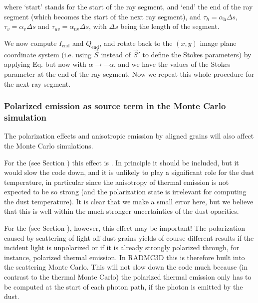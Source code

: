 \documentclass[letterpaper,10pt,english]{sphinxmanual}
\begin{document}
where ‘start’ stands for the start of the ray segment, and ‘end’ the end of the
ray segment (which becomes the start of the next ray segment), and
\(\tau_h=\alpha_{\mathrm{h}}\Delta s\),
\(\tau_v=\alpha_{\mathrm{v}}\Delta s\) and
\(\tau_{uv}=\alpha_{\mathrm{uv}}\Delta s\), with \(\Delta s\) being the
length of the segment.

We now compute \(I_{\mathrm{end}}\) and \(Q_{\mathrm{end}}\), and rotate
back to the \((x,y)\) image plane coordinate system (i.e. using \(\vec
S\) instead of \(\vec S'\) to define the Stokes parameters) by applying
Eq.  but now with \(\alpha\rightarrow -\alpha\),
and we have the values of the Stokes parameter at the end of the ray
segment. Now we repeat this whole procedure for the next ray segment.


\subsubsection{Polarized emission as source term in the Monte Carlo simulation}
\label{\detokenize{dustradtrans:polarized-emission-as-source-term-in-the-monte-carlo-simulation}}
The polarization effects and anisotropic emission by aligned grains will
also affect the Monte Carlo simulations.

For the  (see Section {\hyperref[\detokenize{dustradtrans:sec-dust-thermal-monte-carlo}]{}})
this effect is . In principle it should be included, but it would
slow the code down, and it is unlikely to play a significant role for the dust
temperature, in particular since the anisotropy of thermal emission is not
expected to be so strong (and the polarization state is irrelevant for computing
the dust temperature). It is clear that we make a small error here, but we
believe that this is well within the much stronger uncertainties of the dust
opacities.

For the  (see Section {\hyperref[\detokenize{dustradtrans:sec-scat-monte-carlo}]{}}),
however, this effect may be important! The polarization caused by scattering of
light off dust grains yields of course different results if the incident light
is unpolarized or if it is already strongly polarized through, for instance,
polarized thermal emission. In RADMC\sphinxhyphen{}3D this is therefore built into the
scattering Monte Carlo. This will not slow down the code much because (in
contrast to the thermal Monte Carlo) the polarized thermal emission only has to
be computed at the start of each photon path, if the photon is emitted by the
dust.
\end{document}
